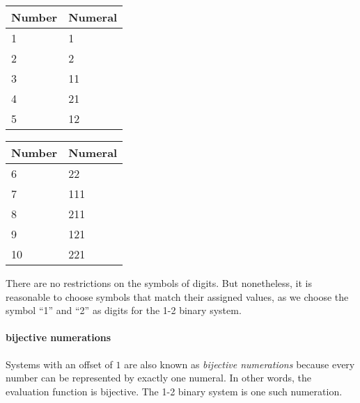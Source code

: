 \documentclass[\main/thesis.tex]{subfiles}
\begin{document}
\begin{center}
    \begin{adjustbox}{max width=\textwidth}
    \begin{tabular}{ | l | l |}
    \textbf{Number} & \textbf{Numeral} \\
    \hline
    1 & 1  \\
    2 & 2  \\
    3 & 11 \\
    4 & 21 \\
    5 & 12 \\
    \end{tabular}
    \quad
    \begin{tabular}{ | l | l | }
    \textbf{Number} & \textbf{Numeral} \\
    \hline
    6  & 22 \\
    7  & 111 \\
    8  & 211 \\
    9  & 121 \\
    10 & 221 \\
    \end{tabular}
    \end{adjustbox}
\end{center}

There are no restrictions on the symbols of digits.
But nonetheless, it is reasonable to choose symbols that match their assigned
values, as we choose the symbol ``1'' and ``2'' as digits for the 1-2 binary system.


\paragraph{bijective numerations}
Systems with an offset of $ 1 $ are also known as \textit{bijective numerations}
because every number can be represented by exactly one numeral. In other words,
the evaluation function is bijective. The 1-2 binary system is one such numeration.
\end{document}
